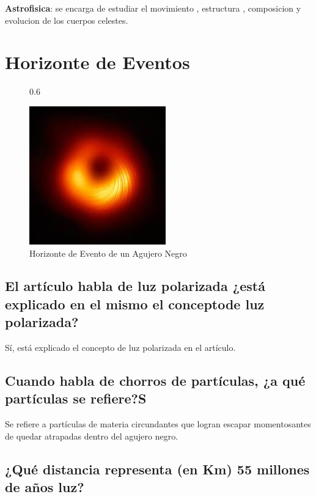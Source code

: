 \documentclass[11pt]{article}
\begin{document}
\begin{multicols}{2}
\textbf{Astrofisica}: se encarga de estudiar el movimiento , estructura , composicion y evolucion de los cuerpos celestes. \cite{fisica}

\section{Horizonte de Eventos}
 \begin{figure}{0.6\linewidth}
  
  \centering
  \includegraphics[width=0.6\linewidth]{hole.jpeg}
   \caption{Horizonte de Evento de un Agujero Negro}
  
\end{figure}

 
\subsection{El artículo habla de luz polarizada ¿está explicado en el mismo el conceptode luz polarizada?}

Sí, está explicado el concepto de luz polarizada en el artículo.

\subsection{Cuando habla de chorros de partículas, ¿a qué partículas se refiere?S}

 Se refiere a partículas de materia circundantes que logran escapar momentosantes de quedar atrapadas dentro del agujero negro.

\subsection{¿Qué distancia representa (en Km) 55 millones de años luz?}


\end{multicols}
\end{document}
